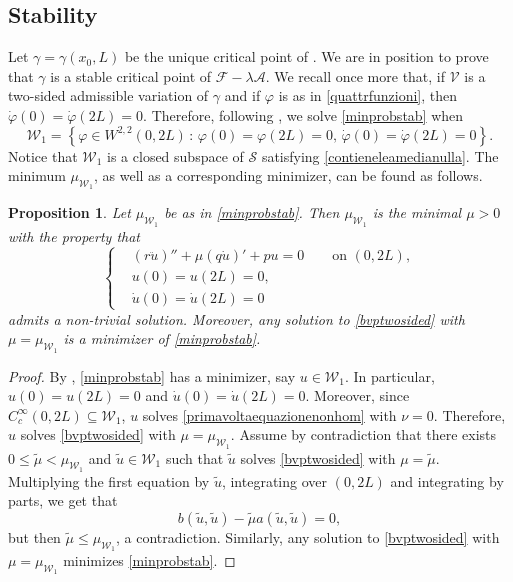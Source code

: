 \documentclass[11pt]{amsart}
\renewcommand{\leq}{\leqslant}
\newcommand{\A}{\mathcal A}
\newcommand{\F}{\mathcal F}
\newtheorem{proposition}[theorem]{Proposition}
\theoremstyle{definition}
\theoremstyle{remark}
\numberwithin{equation}{section}
\begin{document}
\subsection{Stability} \label{subsec:stab}
Let $\gamma=\gamma(x_0,L)$ be the unique critical point of . We are in position to prove that $\gamma$ is a stable critical point of $\F-\lambda\A$.
We recall once more that, if  $\mathcal V$ is a two-sided admissible variation of $\gamma$ and if $\varphi$ is as in \eqref{quattrfunzioni}, then $\dot\varphi(0)=\dot\varphi(2L)=0$. Therefore, following , we solve \eqref{minprobstab} when \begin{equation}\label{defiw1}
\mathcal W_1=\left\{\varphi\in W^{2,2}(0,2L)\,:\,\varphi(0)=\varphi(2L)=0,\,\dot\varphi(0)=\dot\varphi(2L)=0\right\}.
\end{equation} 
Notice that $\mathcal W_1$ is a closed subspace of $\mathcal S$ satisfying \eqref{contieneleamedianulla}. The minimum $\mu_{\mathcal W_1}$, as well as a corresponding minimizer, can be found as follows.
\begin{proposition}\label{characteigentwosided}
Let $\mu_{\mathcal W_1}$ be as in \eqref{minprobstab}. Then     $\mu_{\mathcal W_1}$ is the minimal $\mu> 0$ with the property that
\begin{equation}\label{bvptwosided}
\left\{
\begin{aligned}
&\left(r \ddot u\right)''+\mu \left(q \dot u\right)' + pu = 0\qquad\text{on }(0,2L), \\
&u(0) = u(2L) = 0, \\
&\dot u (0) = \dot u(2L) = 0
\end{aligned}
\right.
\end{equation}
admits a non-trivial solution. Moreover, any solution to \eqref{bvptwosided} with $\mu=\mu_{\mathcal W_1}$ is a minimizer of \eqref{minprobstab}.
\end{proposition}
\begin{proof}
By , \eqref{minprobstab} has a minimizer, say $u\in\mathcal W_1$. In particular, $u(0)=u(2L)=0$ and $\dot u(0)=\dot u(2L)=0$. Moreover, since $C_c^\infty(0,2L)\subseteq \mathcal W_1$, $u$ solves \eqref{primavoltaequazionenonhom} with $\nu=0$. Therefore, $u$ solves \eqref{bvptwosided} with $\mu=\mu_{\mathcal W_1}$. Assume by contradiction that there exists $0\leq \tilde \mu<\mathcal \mu_{\mathcal W_1}$ and $\tilde u\in\mathcal W_1$ such that $\tilde u$ solves \eqref{bvptwosided} with $\mu=\tilde \mu$.
Multiplying the first equation by $\tilde u $, integrating over $(0,2L)$ and integrating by parts, we get that 
\begin{equation*}
b(\tilde u,\tilde u)-\tilde \mu a(\tilde u,\tilde u)=0,
\end{equation*}
but then $\tilde \mu\leq \mu_{\mathcal W_1}$, a contradiction. Similarly, any solution to \eqref{bvptwosided} with $\mu=\mu_{\mathcal W_1}$ minimizes \eqref{minprobstab}.
\end{proof}
\end{document}
